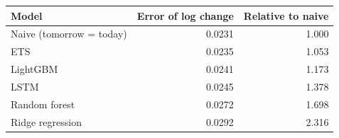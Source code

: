 \begin{tabular}{lrr}
\toprule
\textbf{Model} & \textbf{Error of log change} & \textbf{Relative to naive} \\
\midrule
Naive (tomorrow = today) & 0.0231 & 1.000 \\
ETS & 0.0235 & 1.053 \\
LightGBM & 0.0241 & 1.173 \\
LSTM & 0.0245 & 1.378 \\
Random forest & 0.0272 & 1.698 \\
Ridge regression & 0.0292 & 2.316 \\
\bottomrule
\end{tabular}

